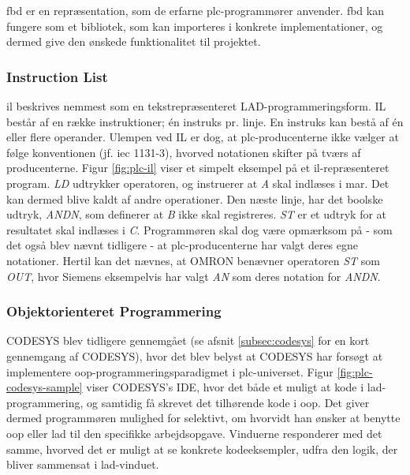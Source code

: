 
\noindent \gls{fbd} er en repræsentation, som de erfarne \gls{plc}-programmører anvender. \gls{fbd} kan fungere som et bibliotek, som kan importeres i konkrete implementationer, og dermed give den ønskede funktionalitet til projektet. \cite{FDB_desc}

\subsubsection{Instruction List}
\gls{il} beskrives nemmest som en tekstrepræsenteret LAD-programmeringsform. IL består af en række instruktioner; én instruks pr. linje. En instruks kan bestå af én eller flere operander. Ulempen ved IL er dog, at \gls{plc}-producenterne ikke vælger at følge konventionen (jf. \gls{iec} 1131-3), hvorved notationen skifter på tværs af producenterne. Figur \ref{fig:plc-il} viser et simpelt eksempel på et \gls{il}-repræsenteret program. \textit{LD} udtrykker operatoren, og instruerer at \textit{A} skal indlæses i \gls{mar}. Det kan dermed blive kaldt af andre operationer. Den næste linje, har det boolske udtryk, \textit{ANDN}, som definerer at \textit{B} ikke skal registreres. \textit{ST} er et udtryk for at resultatet skal indlæses i \textit{C}. Programmøren skal dog være opmærksom på - som det også blev nævnt tidligere - at \gls{plc}-producenterne har valgt deres egne notationer. Hertil kan det nævnes, at OMRON benævner operatoren \textit{ST} som \textit{OUT}, hvor Siemens eksempelvis har valgt \textit{AN} som deres notation for \textit{ANDN}. \cite{FDB_desc}


\subsubsection{Objektorienteret Programmering}
\label{subsec:software_codesys}

CODESYS blev tidligere gennemgået (se afsnit \ref{subsec:codesys} for en kort gennemgang af CODESYS), hvor det blev belyst at CODESYS har forsøgt at implementere \gls{oop}-programmeringsparadigmet i \gls{plc}-universet. Figur \ref{fig:plc-codesys-sample} viser CODESYS's IDE, hvor det både et muligt at kode i \gls{lad}-programmering, og samtidig få skrevet det tilhørende kode i \gls{oop}. Det giver dermed programmøren mulighed for selektivt, om hvorvidt han ønsker at benytte \gls{oop} eller \gls{lad} til den specifikke arbejdsopgave. Vinduerne responderer med det samme, hvorved det er muligt at se konkrete kodeeksempler, udfra den logik, der bliver sammensat i \gls{lad}-vinduet. 

